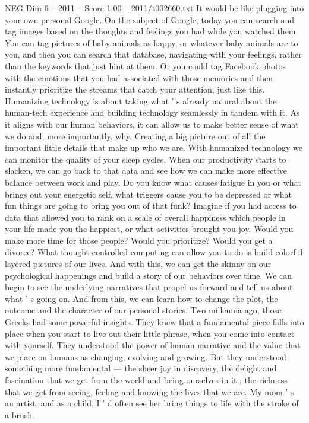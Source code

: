 \begin{textsample}{NEG Dim 6 – 2011 – Score 1.00 – 2011/t002660.txt}
It would be like plugging into your own personal Google.
On the subject of Google, today you can search and tag images based on the thoughts and feelings you had while you watched them.
You can tag pictures of baby animals as happy, or whatever baby animals are to you, and then you can search that database, navigating with your feelings, rather than the keywords that just hint at them.
Or you could tag Facebook photos with the emotions that you had associated with those memories and then instantly prioritize the streams that catch your attention, just like this.
Humanizing technology is about taking what ' s already natural about the human-tech experience and building technology seamlessly in tandem with it.
As it aligns with our human behaviors, it can allow us to make better sense of what we do and, more importantly, why.
Creating a big picture out of all the important little details that make up who we are.
With humanized technology we can monitor the quality of your sleep cycles.
When our productivity starts to slacken, we can go back to that data and see how we can make more effective balance between work and play.
Do you know what causes fatigue in you or what brings out your energetic self, what triggers cause you to be depressed or what fun things are going to bring you out of that funk?
Imagine if you had access to data that allowed you to rank on a scale of overall happiness which people in your life made you the happiest, or what activities brought you joy.
Would you make more time for those people?
Would you prioritize?
Would you get a divorce?
What thought-controlled computing can allow you to do is build colorful layered pictures of our lives.
And with this, we can get the skinny on our psychological happenings and build a story of our behaviors over time.
We can begin to see the underlying narratives that propel us forward and tell us about what ' s going on.
And from this, we can learn how to change the plot, the outcome and the character of our personal stories.
Two millennia ago, those Greeks had some powerful insights.
They knew that a fundamental piece falls into place when you start to live out their little phrase, when you come into contact with yourself.
They understood the power of human narrative and the value that we place on humans as changing, evolving and growing.
But they understood something more fundamental — the sheer joy in discovery, the delight and fascination that we get from the world and being ourselves in it ; the richness that we get from seeing, feeling and knowing the lives that we are.
My mom ' s an artist, and as a child, I ' d often see her bring things to life with the stroke of a brush.

\end{textsample}
